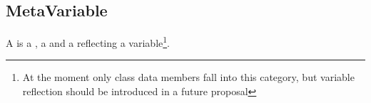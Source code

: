 \subsection{MetaVariable}
\label{concept-MetaVariable}

A  is a , a  and a 
reflecting a variable\footnote{At the moment only class data members fall
into this category, but variable reflection should be introduced in a future
proposal}.




